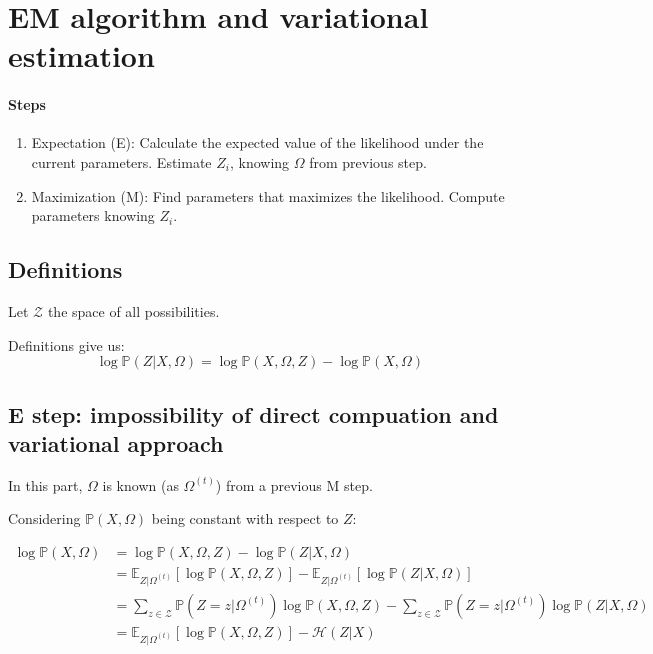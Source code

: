\documentclass[10pt]{article}
\begin{document}
\section{EM algorithm and variational estimation}

\paragraph{Steps}

\begin{enumerate}
	\item Expectation (E): Calculate the expected value of the likelihood under the current parameters. Estimate $Z_i$, knowing $\Omega$ from previous step.
	\item Maximization (M): Find parameters that maximizes the likelihood. Compute parameters knowing $Z_i$.
\end{enumerate}

\subsection{Definitions} 
Let $\mathcal{Z}$ the space of all possibilities. 

Definitions give us: 
\[ \log \mathbb{P}(Z|X, \Omega) = \log \mathbb{P}(X,\Omega, Z) - \log \mathbb{P}(X, \Omega) \]

\subsection{E step: impossibility of direct compuation and variational approach} 
In this part, $\Omega$ is known (as $\Omega^{(t)}$) from a previous M step.

Considering $\mathbb{P}(X, \Omega)$ being constant with respect to $Z$: 

\begin{align*}
\log \mathbb{P}(X, \Omega) &= \log \mathbb{P}(X,\Omega, Z) - \log \mathbb{P}(Z|X, \Omega) \\
	&= \mathbb{E}_{Z|\Omega^(t)}[\log \mathbb{P}(X,\Omega, Z)] - \mathbb{E}_{Z|\Omega^(t)}[\log \mathbb{P}(Z|X, \Omega)] \\
 	&= \sum_{z\in \mathcal{Z}} \mathbb{P}(Z=z | \Omega^{(t)})\log \mathbb{P}(X,\Omega, Z) - \sum_{z\in \mathcal{Z}} \mathbb{P}(Z=z | \Omega^{(t)}) \log \mathbb{P}(Z|X, \Omega) \\ 	 	
 	& = \mathbb{E}_{Z|\Omega^(t)}[\log \mathbb{P}(X,\Omega, Z)] - \mathcal{H}(Z|X) \\
\end{align*}
\end{document}
